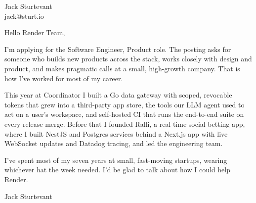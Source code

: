 \documentclass[11pt]{article}
\begin{document}
\raggedright

{\namefont\fontsize{20pt}{24pt}\selectfont Jack Sturtevant}\\[-0.3em]
jack@sturt.io

\vspace{1.2em}

Hello Render Team,

I'm applying for the Software Engineer, Product role. The posting asks for someone who builds new products across the stack, works closely with design and product, and makes pragmatic calls at a small, high-growth company. That is how I've worked for most of my career.

This year at Coordinator I built a Go data gateway with scoped, revocable tokens that grew into a third-party app store, the tools our LLM agent used to act on a user's workspace, and self-hosted CI that runs the end-to-end suite on every release merge. Before that I founded Ralli, a real-time social betting app, where I built NestJS and Postgres services behind a Next.js app with live WebSocket updates and Datadog tracing, and led the engineering team.

I've spent most of my seven years at small, fast-moving startups, wearing whichever hat the week needed. I'd be glad to talk about how I could help Render.

\vspace{0.6em}
Jack Sturtevant
\end{document}

